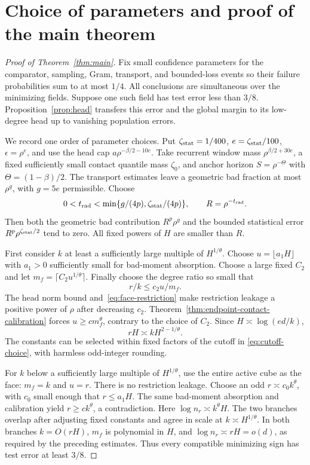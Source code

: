 \section{Choice of parameters and proof of the main theorem}
\label{sec:assembly}
\begin{proof}[Proof of Theorem~\ref{thm:main}]
Fix small confidence parameters for the comparator, sampling, Gram,
transport, and bounded-loss events so their failure probabilities sum
to at most $1/4$. All conclusions are simultaneous over the minimizing
fields. Suppose one such field has test error less than $3/8$.
Proposition~\ref{prop:head} transfers this error and the global margin
to its low-degree head up to vanishing population errors.

We record one order of parameter choices. Put
$\zeta_{\rm stat}=1/400$, $e=\zeta_{\rm stat}/100$,
$\epsilon=\rho^e$, and use the head cap
$a\rho^{-\beta/2-10e}$. Take recurrent window mass
$\rho^{\beta/2+30e}$, a fixed sufficiently small contact quantile mass $\zeta_0$, and anchor horizon
$S=\rho^{-\Theta}$ with $\Theta=(1-\beta)/2$.
The transport estimates leave a geometric bad fraction at most
$\rho^g$, with $g=5e$ permissible. Choose
\[
 0<t_{\rm rad}<\min\{g/(4p),\zeta_{\rm stat}/(4p)\},
 \qquad R=\rho^{-t_{\rm rad}}.
\]
Then both the geometric bad contribution $R^p\rho^g$ and the bounded
statistical error $R^p\rho^{\zeta_{\rm stat}/2}$ tend to zero.
All fixed powers of $H$ are smaller than $R$.

First consider $k$ at least a sufficiently large multiple of
$H^{1/\theta}$. Choose $u=\lfloor a_1H\rfloor$ with $a_1>0$
sufficiently small for bad-moment absorption. Choose a large fixed
$C_2$ and let $m_f=\lceil C_2u^{1/\theta}\rceil$.
Finally choose the degree ratio so small that
\[
 r/k\le c_2u/m_f.
\]
The head norm bound and~\eqref{eq:face-restriction} make restriction
leakage a positive power of $\rho$ after decreasing $c_2$.
Theorem~\ref{thm:endpoint-contact-calibration} forces
$u\ge c m_f^\theta$, contrary to
the choice of $C_2$. Since $H\asymp\log(ed/k)$,
\[
 rH\asymp kH^{2-1/\theta}.
\]
The constants can be selected within fixed factors of the cutoff in
\eqref{eq:cutoff-choice}, with harmless odd-integer rounding.

For $k$ below a sufficiently large multiple of $H^{1/\theta}$, use the
entire active cube as the face: $m_f=k$ and $u=r$.
There is no restriction leakage. Choose an odd
$r\asymp c_0 k^\theta$, with $c_0$ small enough that $r\le a_1H$.
The same bad-moment absorption and calibration yield
$r\ge c k^\theta$, a contradiction. Here
$\log n_r\asymp k^\theta H$. The two branches overlap after adjusting
fixed constants and agree in scale at $k\asymp H^{1/\theta}$.
In both branches $k=O(rH)$, $m_f$ is polynomial in $H$, and
$\log n_r\asymp rH=o(d)$, as required by the preceding estimates.
Thus every compatible minimizing sign has test error at least $3/8$.


\end{proof}
